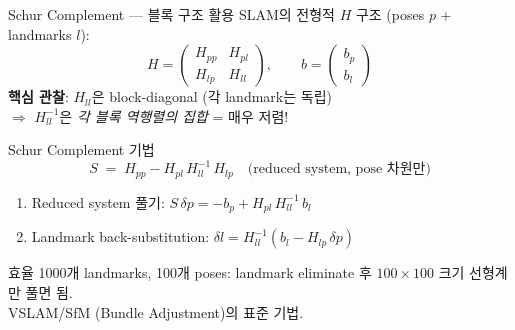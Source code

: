 \begin{frame}[shrink=10]{Schur Complement — 블록 구조 활용}
  SLAM의 전형적 $H$ 구조 (poses $p$ + landmarks $l$):
  \[
    H =
    \begin{pmatrix}
      H_{pp} & H_{pl} \\
      H_{lp} & H_{ll}
    \end{pmatrix},
    \qquad
    b =
    \begin{pmatrix}
      b_p \\ b_l
    \end{pmatrix}
  \]
  \pause
  \textbf{핵심 관찰}: $H_{ll}$은 block-diagonal (각 landmark는 독립)\\
  $\Rightarrow$ $H_{ll}^{-1}$은 \emph{각 블록 역행렬의 집합} = 매우 저렴!
  \pause
  \begin{block}{Schur Complement 기법}
    \[
      S \;=\; H_{pp} - H_{pl}\,H_{ll}^{-1}\,H_{lp}
      \quad \text{(reduced system, pose 차원만)}
    \]
    \begin{enumerate}
      \item Reduced system 풀기: $S\,\delta p = -b_p + H_{pl}\,H_{ll}^{-1}\,b_l$
      \item Landmark back-substitution: $\delta l = H_{ll}^{-1}(b_l - H_{lp}\,\delta p)$
    \end{enumerate}
  \end{block}
  \pause
  \begin{exampleblock}{효율}
    1000개 landmarks, 100개 poses: landmark eliminate 후 $100\!\times\!100$ 크기 선형계만 풀면 됨.\\
    VSLAM/SfM (Bundle Adjustment)의 표준 기법.
  \end{exampleblock}
\end{frame}

